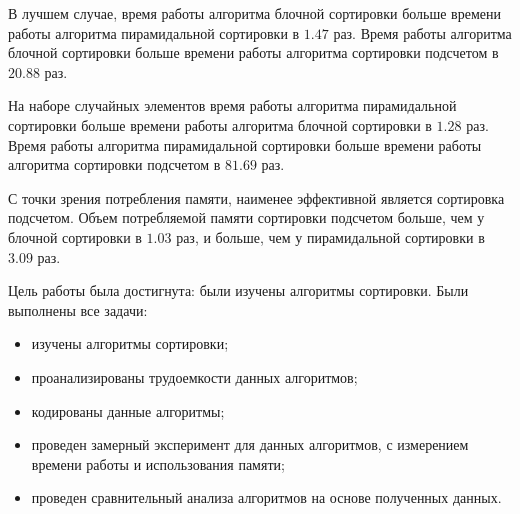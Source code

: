 В лучшем случае, время работы алгоритма блочной сортировки больше времени работы алгоритма пирамидальной сортировки в $1.47$ раз. Время работы алгоритма блочной сортировки больше времени работы алгоритма сортировки подсчетом в $20.88$ раз. 

На наборе случайных элементов время работы алгоритма пирамидальной сортировки больше времени работы алгоритма блочной сортировки в $1.28$ раз. Время работы алгоритма пирамидальной сортировки больше времени работы алгоритма сортировки подсчетом в $81.69$ раз. 

С точки зрения потребления памяти, наименее эффективной является сортировка подсчетом. Объем потребляемой памяти сортировки подсчетом больше, чем у блочной сортировки в $1.03$ раз, и больше, чем у пирамидальной сортировки в $3.09$ раз.

Цель работы была достигнута: были изучены алгоритмы сортировки. Были выполнены все задачи:

\begin{itemize}
	\item изучены алгоритмы сортировки;
	\item проанализированы трудоемкости данных алгоритмов;
	\item кодированы данные алгоритмы;
	\item проведен замерный эксперимент для данных алгоритмов, с измерением времени работы и использования памяти; 
	\item проведен сравнительный анализа алгоритмов на основе полученных данных.
\end{itemize}


\newpage